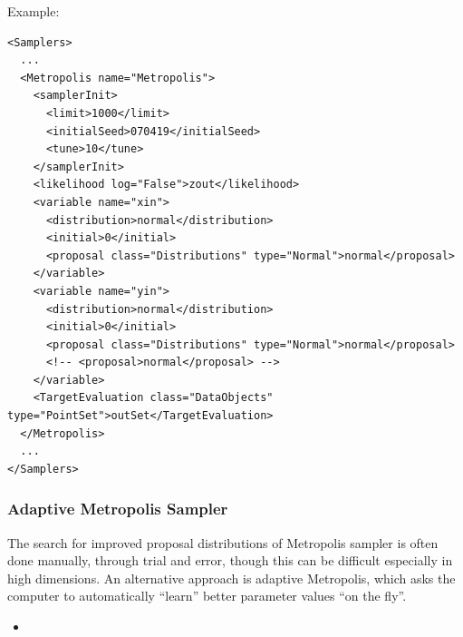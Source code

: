 Example:
\begin{lstlisting}[style=XML]
<Samplers>
  ...
  <Metropolis name="Metropolis">
    <samplerInit>
      <limit>1000</limit>
      <initialSeed>070419</initialSeed>
      <tune>10</tune>
    </samplerInit>
    <likelihood log="False">zout</likelihood>
    <variable name="xin">
      <distribution>normal</distribution>
      <initial>0</initial>
      <proposal class="Distributions" type="Normal">normal</proposal>
    </variable>
    <variable name="yin">
      <distribution>normal</distribution>
      <initial>0</initial>
      <proposal class="Distributions" type="Normal">normal</proposal>
      <!-- <proposal>normal</proposal> -->
    </variable>
    <TargetEvaluation class="DataObjects" type="PointSet">outSet</TargetEvaluation>
  </Metropolis>
  ...
</Samplers>
\end{lstlisting}

\subsubsection{Adaptive Metropolis Sampler}
\label{subsubsubsec:adaptiveMetropolis}

The search for improved proposal distributions of Metropolis sampler is often
done manually, through trial and error, though this can be difficult especially
in high dimensions. An alternative approach is adaptive Metropolis, which asks
the computer to automatically ``learn'' better parameter values ``on the fly''.

%
\attrIntro

\begin{itemize}
  \itemsep0em
  \item \nameDescription
\end{itemize}


